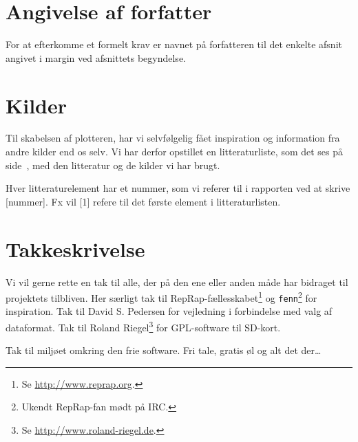 

\section{Angivelse af forfatter}

For at efterkomme et formelt krav er navnet på forfatteren til det
enkelte afsnit angivet i margin ved afsnittets begyndelse.


\section{Kilder}
Til skabelsen af plotteren, har vi selvfølgelig fået inspiration og
information fra andre kilder end os selv. Vi har derfor opstillet en
litteraturliste, som det ses på side~\pageref{ch:litteratur}, med den
litteratur og de kilder vi har brugt.

Hver litteraturelement har et nummer, som vi referer til i rapporten
ved at skrive [nummer]. Fx vil [1] refere til det første element i
litteraturlisten.


\section{Takkeskrivelse}


Vi vil gerne rette en tak til alle, der på den ene eller anden måde
har bidraget til projektets tilbliven. Her særligt tak til
RepRap-fællesskabet\footnote{Se \url{http://www.reprap.org}.} og
\texttt{fenn}\footnote{Ukendt RepRap-fan mødt på IRC.} for
inspiration. Tak til David S. Pedersen for vejledning i forbindelse
med valg af dataformat. Tak til Roland Riegel\footnote{Se
  \url{http://www.roland-riegel.de}.} for GPL-software til SD-kort.

Tak til miljøet omkring den frie software. Fri tale, gratis øl og alt
det der\dots {}


